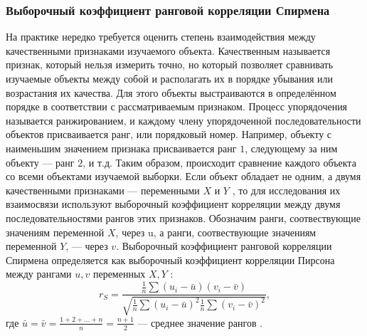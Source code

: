 \documentclass[../body.tex]{subfiles}
\begin{document}
	\subsubsection{Выборочный коэффициент ранговой корреляции Спирмена}
	На практике нередко требуется оценить степень взаимодействия между качественными признаками изучаемого объекта. Качественным называется признак, который нельзя измерить точно, но который позволяет сравнивать изучаемые объекты между собой и располагать их в порядке убывания или возрастания их качества. Для этого объекты выстраиваются в определённом порядке в соответствии с рассматриваемым признаком. Процесс упорядочения называется ранжированием, и каждому члену упорядоченной последовательности объектов присваивается ранг, или порядковый номер. Например, объекту с наименьшим значением признака присваивается ранг $1$, следующему за ним объекту — ранг $2$, и т.д. Таким образом, происходит сравнение каждого объекта со всеми объектами изучаемой выборки.
	\newline
	Если объект обладает не одним, а двумя качественными признаками — переменными $X$ и $Y$ , то для исследования их взаимосвязи используют выборочный коэффициент корреляции между двумя последовательностями рангов этих признаков.
	\newline
	Обозначим ранги, соотвествующие значениям переменной $X$, через u, а ранги, соотвествующие значениям переменной $Y$, — через $v$.
	\newline
	Выборочный коэффициент ранговой корреляции Спирмена определяется как выборочный коэффициент корреляции Пирсона между рангами $u,v$ переменных $X,Y$ :
	\begin{equation}
		r_{S} = \frac{
			\frac{1}{n}\sum{(u_{i} - \bar{u})(v_{i}-\bar{v})}
		}{
			\sqrt{\frac{1}{n}\sum{(u_{i} - \bar{u})^{2}}\frac{1}{n}\sum{(v_{i} - \bar{v})^{2}}}
		},
		\label{rS}
	\end{equation}
	где $\bar{u} = \bar{v} = \frac{1 + 2 + ... + n}{n} = \frac{n + 1}{2}$ — среднее значение рангов \cite[c.~540-541]{max}.
	
	
\end{document}
